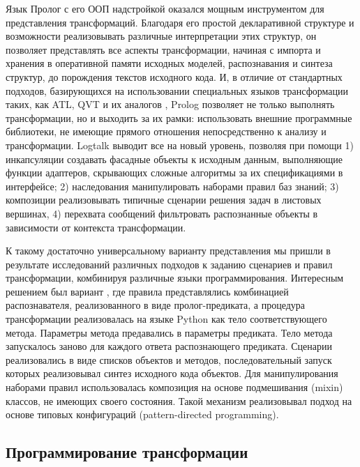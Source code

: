 \documentclass[12pt]{article}
\begin{document}
Язык Пролог с его ООП надстройкой оказался мощным инструментом для представления трансформаций.  Благодаря его простой декларативной структуре и возможности реализовывать различные интерпретации этих структур, он позволяет представлять все аспекты трансформации, начиная с импорта и хранения в оперативной памяти исходных моделей, распознавания и синтеза структур, до порождения текстов исходного кода.  И, в отличие от стандартных подходов, базирующихся на использовании специальных языков трансформации таких, как ATL, QVT и их аналогов \cite{azis,QVT,nikita}, Prolog позволяет не только выполнять трансформации, но и выходить за их рамки: использовать внешние программные библиотеки, не имеющие прямого отношения непосредственно к анализу и трансформации.  Logtalk выводит все на новый уровень, позволяя при помощи 1) инкапсуляции создавать фасадные объекты к исходным данным, выполняющие функции адаптеров, скрывающих сложные алгоритмы за их спецификациями в интерфейсе; 2) наследования манипулировать наборами правил баз знаний; 3) композиции реализовывать типичные сценарии решения задач в листовых вершинах, 4) перехвата сообщений фильтровать распознанные объекты в зависимости от контекста трансформации.

К такому достаточно универсальному варианту представления мы пришли в результате исследований различных подходов к заданию сценариев и правил трансформации, комбинируя различные языки программирования.  Интересным решением был вариант \cite{b2}, где правила представлялись комбинацией распознавателя, реализованного в виде пролог-предиката, а процедура трансформации реализовалась на языке Python как тело соответствующего метода.  Параметры метода предавались в параметры предиката.  Тело метода запускалось заново для каждого ответа распознающего предиката.  Сценарии реализовались в виде списков объектов и методов, последовательный запуск которых реализовывал синтез исходного кода объектов.  Для манипулирования наборами правил использовалась композиция на основе подмешивания (mixin) классов, не имеющих своего состояния.  Такой механизм реализовывал подход на основе типовых конфигураций (pattern-directed programming).

\subsection{Программирование трансформации}
\end{document}
